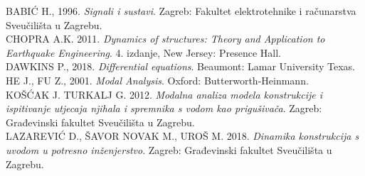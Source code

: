 BABIĆ H., 1996. \textit{Signali i sustavi}. Zagreb: Fakultet elektrotehnike i računarstva 
Sveučilišta u Zagrebu.\\[6pt]
%
CHOPRA A.K. 2011. \textit{Dynamics of structures: Theory and Application to Earthquake 
Engineering}. 4. izdanje, New Jersey: Presence Hall.\\[6pt]
%
DAWKINS P., 2018. \textit{Differential equations}. Beaumont: Lamar University
Texas.\\[6pt]
%
HE J., FU Z., 2001. \textit{Modal Analysis}. Oxford: Butterworth-Heinmann.\\[6pt]
%
KOŠĆAK J. TURKALJ G. 2012. \textit{Modalna analiza modela konstrukcije i ispitivanje 
utjecaja njihala i spremnika s vodom kao prigušivača}. Zagreb: Građevinski fakultet 
Sveučilišta u Zagrebu.\\[6pt]
%
LAZAREVIĆ D., ŠAVOR NOVAK M., UROŠ M. 2018. \textit{Dinamika konstrukcija s uvodom u
potresno inženjerstvo}. Zagreb: Građevinski fakultet Sveučilišta u Zagrebu.\\
